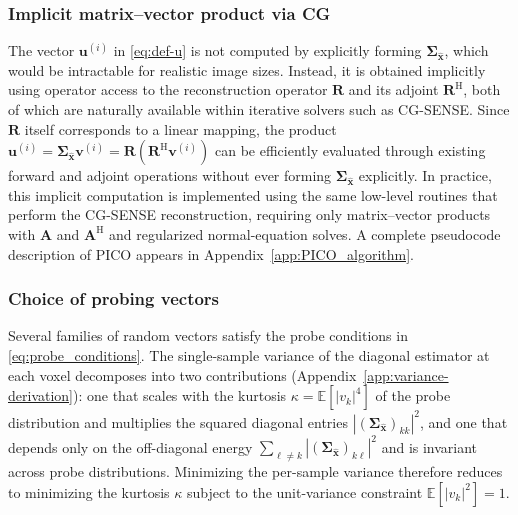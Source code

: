 \documentclass[AMA,STIX2COL,Linenumberson]{MRM}
\begin{document}
\subsubsection{Implicit matrix–vector product via CG}
The vector $\mathbf{u}^{(i)}$ in \eqref{eq:def-u} is not computed by explicitly forming 
$\mathbf{\Sigma}_{\hat{\mathbf{x}}}$, which would be intractable for realistic image sizes. 
Instead, it is obtained implicitly using operator access to the reconstruction operator 
$\mathbf{R}$ and its adjoint $\mathbf{R}^\mathrm{H}$, both of which are naturally 
available within iterative solvers such as CG-SENSE. 
Since $\mathbf{R}$ itself corresponds to a linear mapping, 
the product $\mathbf{u}^{(i)} = \mathbf{\Sigma}_{\hat{\mathbf{x}}}\mathbf{v}^{(i)} 
= \mathbf{R}(\mathbf{R}^\mathrm{H}\mathbf{v}^{(i)})$ can be efficiently evaluated 
through existing forward and adjoint operations without ever forming $\mathbf{\Sigma}_{\hat{\mathbf{x}}}$ 
explicitly. In practice, this implicit computation is implemented using the same low-level routines that perform the CG-SENSE reconstruction, requiring only matrix–vector products with 
$\mathbf{A}$ and $\mathbf{A}^\mathrm{H}$ and regularized normal-equation solves. A complete pseudocode description of PICO appears in Appendix~\ref{app:PICO_algorithm}.

\subsubsection{Choice of probing vectors}
\label{sec:probes}
Several families of random vectors satisfy the probe conditions in \eqref{eq:probe_conditions}. The single-sample variance of the diagonal estimator at each voxel decomposes into two contributions (Appendix~\ref{app:variance-derivation}): one that scales with the kurtosis $\kappa = \mathbb{E}[|v_k|^4]$ of the probe distribution and multiplies the squared diagonal entries $|(\boldsymbol{\Sigma}_{\hat{\mathbf{x}}})_{kk}|^2$, and one that depends only on the off-diagonal energy $\sum_{\ell\neq k}|(\boldsymbol{\Sigma}_{\hat{\mathbf{x}}})_{k\ell}|^2$ and is invariant across probe distributions. Minimizing the per-sample variance therefore reduces to minimizing the kurtosis $\kappa$ subject to the unit-variance constraint $\mathbb{E}[|v_k|^2] = 1$.
\end{document}
